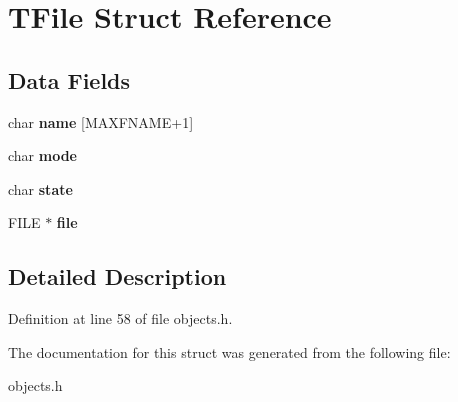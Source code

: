 \hypertarget{struct_t_file}{}\section{T\+File Struct Reference}
\label{struct_t_file}
\subsection*{Data Fields}
\begin{DoxyCompactItemize}
\item 
\mbox{\label{struct_t_file_aaf028e551d3ca49e74215ff7db0b0559}} 
char {\bfseries name} \mbox{[}M\+A\+X\+F\+N\+A\+ME+1\mbox{]}
\item 
\mbox{\label{struct_t_file_a000e34997df38c2005a83d63e67d9282}} 
char {\bfseries mode}
\item 
\mbox{\label{struct_t_file_afc09df66e4e1131bad27f84d29bd8726}} 
char {\bfseries state}
\item 
\mbox{\label{struct_t_file_a702945180aa732857b380a007a7e2a21}} 
F\+I\+LE $\ast$ {\bfseries file}
\end{DoxyCompactItemize}


\subsection{Detailed Description}


Definition at line 58 of file objects.\+h.



The documentation for this struct was generated from the following file\+:\begin{DoxyCompactItemize}
\item 
objects.\+h\end{DoxyCompactItemize}
